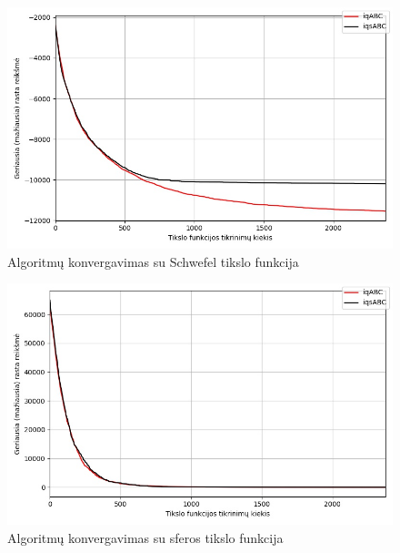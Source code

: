 \documentclass{VUMIFKompMagistrinis}
\begin{document}
\begin{landscape}
\begin{multicols}{2}
\begin{figure}[H]
    \centering
    \includegraphics[scale=0.5]{img/2kg/Schwefel.jpg}
     \caption{Algoritmų konvergavimas su Schwefel tikslo funkcija}
    \label{img:vkon8a}
\end{figure}



\begin{figure}[H]
    \centering
    \includegraphics[scale=0.5]{img/2kg/Sphere.jpg}
     \caption{Algoritmų konvergavimas su sferos tikslo funkcija}
    \label{img:vkon8}
\end{figure}




\end{multicols}
\begin{multicols}{2}



\end{multicols}
\end{landscape}
\end{document}
